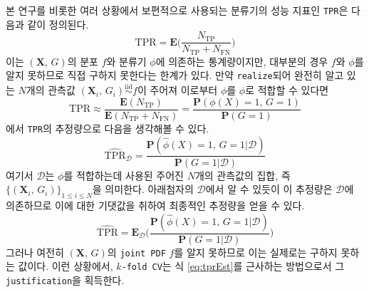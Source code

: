 \documentclass[11pt,onecolumn,twoside,a4size]{gsag3jnl}
\newcommand{\iid}{\stackrel{\mathrm{iid}}{\sim}}
\begin{document}
본 연구를 비롯한 여러 상황에서 보편적으로 사용되는 분류기의 성능 지표인 \texttt{TPR}은 다음과 같이 정의된다.
\begin{equation}
  \mathrm{TPR}=\mathbf{E}\bigg(\frac{N_\mathrm{TP}}{N_\mathrm{TP}+N_\mathrm{FN}}\bigg)
\end{equation}
이는 $(\mathbf{X},\,G)$의 분포 $f$와 분류기 $\phi$에 의존하는 통계량이지만, 대부분의 경우 $f$와 $\phi$를 알지 못하므로 직접 구하지 못한다는 한계가 있다. 만약 \texttt{realize}되어 완전히 알고 있는 $N$개의 관측값 $(\mathbf{X}_i,\,G_i)\iid f$이 주어져 이로부터 $\phi$를 $\widehat{\phi}$로 적합할 수 있다면
\begin{equation}
  \mathrm{TPR}\approx\frac{\mathbf{E}(N_\mathrm{TP})}{\mathbf{E}(N_\mathrm{TP}+N_\mathrm{FN})}=\frac{\mathbf{P}(\phi(X)=1,\,G=1)}{\mathbf{P}(G=1)}
\end{equation}
에서 \texttt{TPR}의 추정량으로 다음을 생각해볼 수 있다.
\begin{equation}
  \widehat{\mathrm{TPR}}_\mathcal{D}=\frac{\mathbf{P}(\widehat{\phi}(X)=1,\,G=1\vert\mathcal{D})}{\mathbf{P}(G=1\vert\mathcal{D})}
\end{equation}
여기서 $\mathcal{D}$는 $\phi$를 적합하는데 사용된 주어진 $N$개의 관측값의 집합, 즉 $\{(\mathbf{X}_i,\,G_i)\}_{1\leq i\leq N}$을 의미한다. 아래첨자의 $\mathcal{D}$에서 알 수 있듯이 이 추정량은 $\mathcal{D}$에 의존하므로 이에 대한 기댓값을 취하여 최종적인 추정량을 얻을 수 있다.
\begin{equation}\label{eq:tprEst}
  \widehat{\mathrm{TPR}}=\mathbf{E}_\mathcal{D}\bigg(\frac{\mathbf{P}(\widehat{\phi}(X)=1,\,G=1\vert\mathcal{D})}{\mathbf{P}(G=1\vert\mathcal{D})}\bigg)
\end{equation}
그러나 여전히 $(\mathbf{X},\,G)$의 \texttt{joint PDF} $f$를 알지 못하므로 이는 실제로는 구하지 못하는 값이다. 이런 상황에서, \texttt{$k$-fold CV}는 식 \ref{eq:tprEst}를 근사하는 방법으로서 그 \texttt{justification}을 획득한다.
\end{document}
